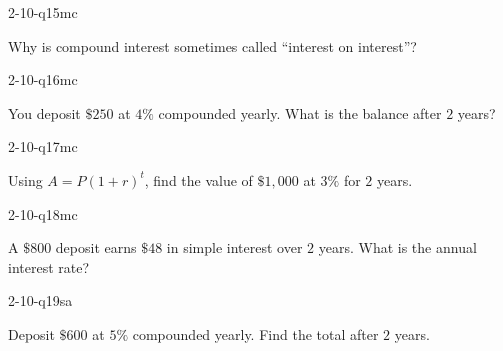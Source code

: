 \begin{practiceQuestion}{2-10-q15}{mc}
\begin{questionText}
Why is compound interest sometimes called ``interest on interest''?
\end{questionText}
\end{practiceQuestion}

\begin{practiceQuestion}{2-10-q16}{mc}
\begin{questionText}
You deposit $\$250$ at $4\%$ compounded yearly. What is the balance after $2$ years?
\end{questionText}
\end{practiceQuestion}

\begin{practiceQuestion}{2-10-q17}{mc}
\begin{questionText}
Using $A = P(1+r)^t$, find the value of $\$1{,}000$ at $3\%$ for $2$ years.
\end{questionText}
\end{practiceQuestion}

\begin{practiceQuestion}{2-10-q18}{mc}
\begin{questionText}
A $\$800$ deposit earns $\$48$ in simple interest over $2$ years. What is the annual interest rate?
\end{questionText}
\end{practiceQuestion}


\begin{practiceQuestion}{2-10-q19}{sa}
\begin{questionText}
Deposit $\$600$ at $5\%$ compounded yearly. Find the total after $2$ years.
\end{questionText}
\end{practiceQuestion}

